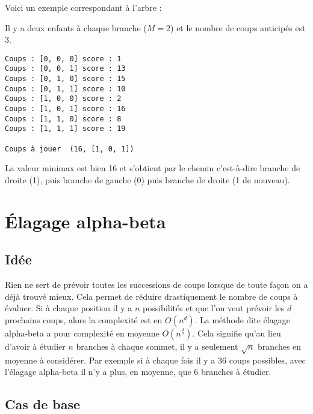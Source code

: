 \documentclass[11pt,class=report,crop=false]{standalone}
\begin{document}
Voici un exemple correspondant à l'arbre :


Il y a deux enfants à chaque branche ($M=2$) et le nombre de coups anticipés est $3$.

\begin{lstlisting}
Coups : [0, 0, 0] score : 1
Coups : [0, 0, 1] score : 13
Coups : [0, 1, 0] score : 15
Coups : [0, 1, 1] score : 10
Coups : [1, 0, 0] score : 2
Coups : [1, 0, 1] score : 16
Coups : [1, 1, 0] score : 8
Coups : [1, 1, 1] score : 19

Coups à jouer  (16, [1, 0, 1])
\end{lstlisting}



La valeur \og{}minimax\fg{} est bien 16 et s'obtient par le chemin \ci{[1, 0, 1]} c'est-à-dire branche de droite (1), puis branche de gauche (0) puis branche de droite (1 de nouveau).


\section{Élagage alpha-beta}


\subsection{Idée}

Rien ne sert de prévoir toutes les successions de coups lorsque de toute façon on a déjà trouvé mieux. Cela permet de réduire drastiquement le nombre de coups à évaluer. 
Si à chaque position il y a $n$ possibilités et que l'on veut prévoir les $d$ prochains coups, alors la complexité est en $O(n^d)$. 
La méthode dite \og{}élagage alpha-beta\fg{} a pour complexité en moyenne $O(n^{\frac d2})$. Cela signifie qu'au lieu d'avoir à étudier $n$ branches à chaque sommet, il y a seulement $\sqrt{n}$ branches en moyenne à considérer.
Par exemple si à chaque fois il y a $36$ coups possibles, avec l'élagage alpha-beta il n'y a plus, en moyenne, que $6$ branches à étudier.

\subsection{Cas de base}
\end{document}
